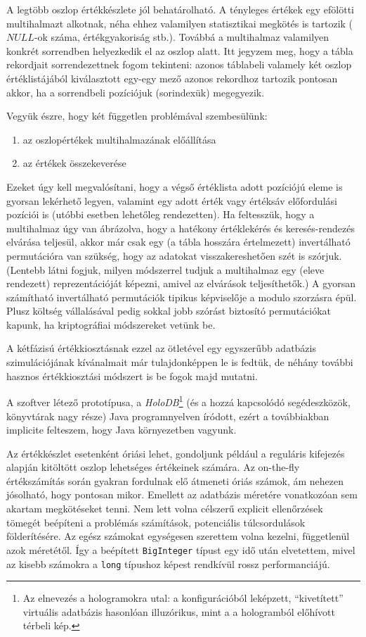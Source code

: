 \documentclass[
    parspace,
    noindent,
    nohyp,
]{elteiktdk}[2023/04/10]
\begin{document}
A legtöbb oszlop értékkészlete jól behatárolható.
A tényleges értékek egy efölötti multihalmazt alkotnak,
néha ehhez valamilyen statisztikai megkötés is tartozik ($NULL$-ok száma, értékgyakoriság stb.).
Továbbá a multihalmaz valamilyen konkrét sorrendben helyezkedik el az oszlop alatt.
Itt jegyzem meg, hogy a tábla rekordjait sorrendezettnek fogom tekinteni:
azonos táblabeli valamely két oszlop értéklistájából kiválasztott egy-egy mező
azonos rekordhoz tartozik pontosan akkor, ha a sorrendbeli pozíciójuk (sorindexük) megegyezik.

Vegyük észre, hogy két független problémával szembesülünk:

\begin{enumerate}
    \item az oszlopértékek multihalmazának előállítása
    \item az értékek összekeverése
\end{enumerate}

Ezeket úgy kell megvalósítani, hogy a végső értéklista adott pozíciójú eleme is gyorsan lekérhető legyen,
valamint egy adott érték vagy értéksáv előfordulási pozíciói is
(utóbbi esetben lehetőleg rendezetten).
Ha feltesszük, hogy a multihalmaz úgy van ábrázolva,
hogy a hatékony értéklekérés és keresés-rendezés elvárása teljesül,
akkor már csak egy (a tábla hosszára értelmezett) invertálható permutációra van szükség,
hogy az adatokat visszakereshetően szét is szórjuk.
(Lentebb látni fogjuk, milyen módszerrel tudjuk a multihalmaz egy (eleve rendezett) reprezentációját képezni,
amivel az elvárások teljesíthetők.)
A gyorsan számítható invertálható permutációk tipikus képviselője a modulo szorzásra épül.
Plusz költség vállalásával pedig sokkal jobb szórást biztosító permutációkat kapunk,
ha kriptográfiai módszereket vetünk be.

A kétfázisú értékkiosztásnak ezzel az ötletével
egy egyszerűbb adatbázis szimulációjának kívánalmait már tulajdonképpen le is fedtük,
de néhány további hasznos értékkiosztási módszert is be fogok majd mutatni.

A szoftver létező prototípusa, a \textit{HoloDB}\footnote{
  Az elnevezés a hologramokra utal:
  a konfigurációból leképzett, ``kivetített'' virtuális adatbázis hasonlóan illuzórikus,
  mint a a hologramból előhívott térbeli kép.
}
(és a hozzá kapcsolódó segédeszközök, könyvtárak nagy része) Java programnyelven íródott,
ezért a továbbiakban implicite felteszem, hogy Java környezetben vagyunk.

Az értékkészlet esetenként óriási lehet,
gondoljunk például a reguláris kifejezés alapján kitöltött oszlop lehetséges értékeinek számára.
Az on-the-fly értékszámítás során gyakran fordulnak elő átmeneti óriás számok,
ám nehezen jósolható, hogy pontosan mikor.
Emellett az adatbázis méretére vonatkozóan sem akartam megkötéseket tenni.
Nem lett volna célszerű explicit ellenőrzések tömegét beépíteni
a problémás számítások, potenciális túlcsordulások földerítésére.
Az egész számokat egységesen szerettem volna kezelni, függetlenül azok méretétől.
Így a beépített \texttt{BigInteger} típust egy idő után elvetettem,
mivel az kisebb számokra a \texttt{long} típushoz képest rendkívül rossz performanciájú.
\end{document}
